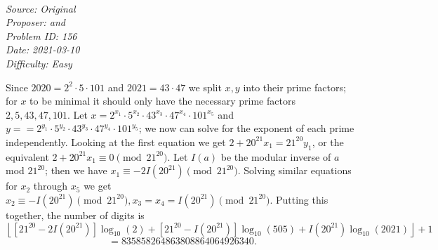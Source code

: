 \SSbreak\\
\emph{Source: Original}\\
\emph{Proposer: \Ptan and \Pwen}\\
\emph{Problem ID: 156}\\
\emph{Date: 2021-03-10}\\
\emph{Difficulty: Easy}\\
\SSbreak

\bigskip

\begin{solution}\hfil\medskip
  
    Since $2020 = 2^2 \cdot 5 \cdot 101$ and $2021 = 43 \cdot 47$ we split $x, y$ into their prime factors; for $x$ to be minimal it should only have the necessary
    prime factors $2, 5, 43, 47, 101$. Let $x = 2^{x_1} \cdot 5^{x_2} \cdot 43^{x_3} \cdot 47^{x_4} \cdot 101^{x_5}$ and 
    $y = = 2^{y_1} \cdot 5^{y_2} \cdot 43^{y_3} \cdot 47^{y_4} \cdot 101^{y_5}$; we now can solve for the exponent of each prime independently. 
    Looking at the first equation we get $2 + 20^{21}x_1 = 21^{20}y_1$, or the equivalent $2 + 20^{21}x_1 \equiv 0 \pmod{21^{20}}$. 
    Let $I(a)$ be the modular inverse of $a$ mod $21^{20}$; then we have $x_1 \equiv -2 I\left(20^{21}\right) \pmod{21^{20}}$. 
    Solving similar equations for $x_2$ through $x_5$ we get $x_2 \equiv - I\left(20^{21}\right) \pmod{21^{20}}, x_3 = x_4 = I\left(20^{21}\right) \pmod{21^{20}}$.
    Putting this together, the number of digits is 
    $$\left\lfloor \left[21^{20} - 2I\left(20^{21}\right)\right] \log_{10}(2) + \left[21^{20} - I\left(20^{21}\right)\right] \log_{10}(505) + I\left(20^{21}\right) \log_{10}(2021) \right\rfloor + 1$$ $$= \boxed{835858264863808864064926340}.$$
\end{solution}\bigskip